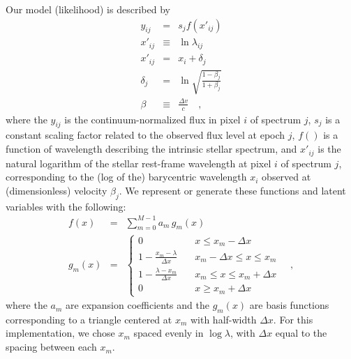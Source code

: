 \documentclass[12pt, letterpaper]{article}
\begin{document}
Our model (likelihood) is described by
\begin{eqnarray}
   y_{ij} &=& s_j f(x'_{ij})
  \\
  x'_{ij} &\equiv& \ln \lambda_{ij}
  \\
  x'_{ij} &=& x_i + \delta_j
  \\
  \delta_j &=& \ln \sqrt{\frac{1 - \beta_j}{1 + \beta_j}}
  \\
  \beta &\equiv& \frac{\Delta v}{c}
  \quad , 
\end{eqnarray}
where the $y_{ij}$ is the continuum-normalized flux in pixel $i$ of
spectrum $j$, $s_j$ is a constant scaling factor related to the observed
flux level at epoch $j$, $f()$ is a function of
wavelength describing the intrinsic stellar spectrum, and
$x'_{ij}$ is the natural logarithm of the stellar rest-frame wavelength
at pixel $i$ of spectrum $j$, 
corresponding to the (log of the) barycentric wavelength $x_i$ observed at
(dimensionless) velocity $\beta_j$.
We represent or generate these functions and latent variables
with the following:
\begin{eqnarray}
  f(x) &=& \sum_{m=0}^{M-1} a_m\,g_m(x)
  \\
  g_m(x) &=& \left\{
        \begin{array}{ll}
            0 & \quad x \leq x_m -\Delta x \\
            1 - \frac{x_m - \lambda}{\Delta x} & \quad x_m - \Delta x \leq x \leq x_m \\
            1 - \frac{\lambda - x_m}{\Delta x} & \quad x_m \leq x \leq x_m + \Delta x \\
            0 & \quad x \geq x_m + \Delta x \label{eqn:triangle}
        \end{array}
    \right.
  \quad ,
\end{eqnarray}
where the $a_m$ are expansion coefficients and the $g_m(x)$
are basis functions corresponding to a triangle centered at $x_m$ with half-width 
$\Delta x$. For this implementation, we chose $x_m$ spaced evenly in $\log \lambda$, 
with $\Delta x$ equal to the spacing between each $x_m$.
\end{document}
